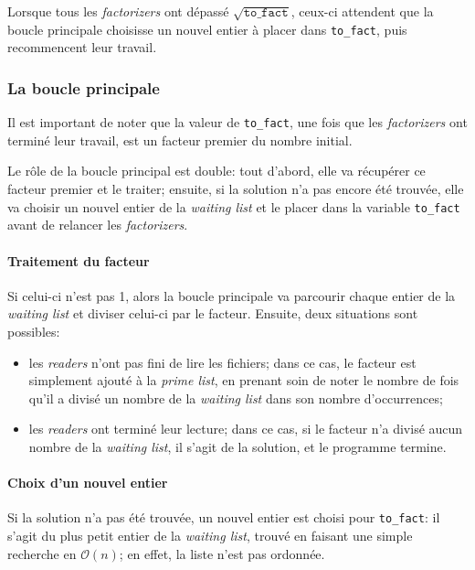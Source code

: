 \documentclass[a4paper,10pt]{article}
\begin{document}
Lorsque tous les \emph{factorizers} ont dépassé $\sqrt{\texttt{to\_fact}}$, ceux-ci attendent que la boucle principale choisisse un nouvel entier à placer dans \texttt{to\_fact}, puis recommencent leur travail.

\subsubsection*{La boucle principale}

Il est important de noter que la valeur de \texttt{to\_fact}, une fois que les \emph{factorizers} ont terminé leur travail, est un facteur premier du nombre initial. %

Le rôle de la boucle principal est double: tout d'abord, elle va récupérer ce facteur premier et le traiter; ensuite, si la solution n'a pas encore été trouvée, elle va choisir un nouvel entier de la \emph{waiting list} et le placer dans la variable \texttt{to\_fact} avant de relancer les \emph{factorizers}.

\paragraph{Traitement du facteur}
Si celui-ci n'est pas 1, alors la boucle principale va parcourir chaque entier de la \emph{waiting list} et diviser celui-ci par le facteur. Ensuite, deux situations sont possibles:
\begin{itemize}
    \item les \emph{readers} n'ont pas fini de lire les fichiers; dans ce cas, le facteur est simplement ajouté à la \emph{prime list}, en prenant soin de noter le nombre de fois qu'il a divisé un nombre de la \emph{waiting list} dans son nombre d'occurrences;
    \item les \emph{readers} ont terminé leur lecture; dans ce cas, si le facteur n'a divisé aucun nombre de la \emph{waiting list}, il s'agit de la solution, et le programme termine.
\end{itemize}

\paragraph{Choix d'un nouvel entier}
Si la solution n'a pas été trouvée, un nouvel entier est choisi pour \texttt{to\_fact}: il s'agit du plus petit entier de la \emph{waiting list}, trouvé en faisant une simple recherche en $\mathcal{O}(n)$; en effet, la liste n'est pas ordonnée.
\end{document}
